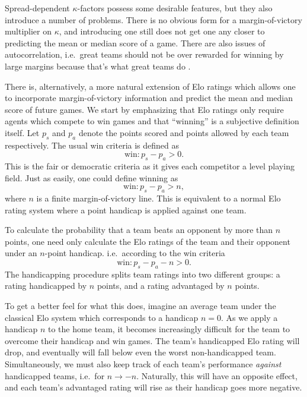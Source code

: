 \documentclass[aps,prc,reprint,amsmath,superscriptaddress,nofootinbib]{revtex4-1}
\begin{document}
Spread-dependent $\kappa$-factors possess some desirable features, but they also introduce a number of problems.
There is no obvious form for a margin-of-victory multiplier on $\kappa$, and introducing one still does not get one any closer to predicting the mean or median score of a game.
There are also issues of autocorrelation, i.e.\ great teams should not be over rewarded for winning by large margins because that's what great teams do \cite{538NFL}.

There is, alternatively, a more natural extension of Elo ratings which allows one to incorporate margin-of-victory information and predict the mean and median score of future games.
We start by emphasizing that Elo ratings only require agents which compete to win games and that ``winning'' is a subjective definition itself.
Let $p_s$ and $p_a$ denote the points scored and points allowed by each team respectively.
The usual win criteria is defined as
\begin{equation}
  \text{win}: p_s - p_a > 0.
\end{equation}
This is the fair or democratic criteria as it gives each competitor a level playing field.
Just as easily, one could define winning as
\begin{equation}
  \text{win}: p_s - p_a > n,
\end{equation}
where $n$ is a finite margin-of-victory line.
This is equivalent to a normal Elo rating system where a point handicap is applied against one team.

To calculate the probability that a team beats an opponent by more than $n$ points, one need only calculate the Elo ratings of the team and their opponent under an $n$-point handicap. i.e.\ according to the win criteria
\begin{equation}
  \text{win}: p_s - p_a - n > 0.
\end{equation}
The handicapping procedure splits team ratings into two different groups: a rating handicapped by $n$ points, and a rating advantaged by $n$ points.

To get a better feel for what this does, imagine an average team under the classical Elo system which corresponds to a handicap $n=0$. 
As we apply a handicap $n$ to the home team, it becomes increasingly difficult for the team to overcome their handicap and win games.
The team's handicapped Elo rating will drop, and eventually will fall below even the worst non-handicapped team.
Simultaneously, we must also keep track of each team's performance \emph{against} handicapped teams, i.e.\ for $n \rightarrow -n$.
Naturally, this will have an opposite effect, and each team's advantaged rating will rise as their handicap goes more negative.
\end{document}
